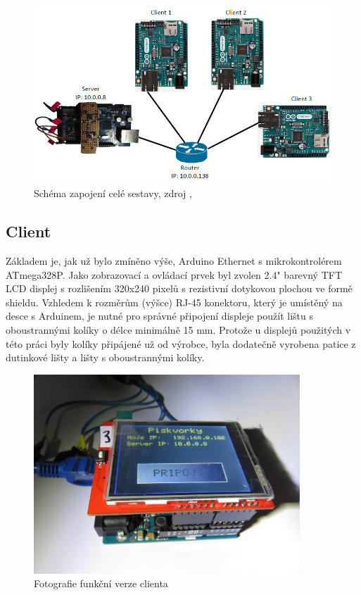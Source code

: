 \documentclass[a4paper,12pt, twoside]{article} %
\begin{document}
\begin{figure}[hbtp]
\centering
\includegraphics[width=12cm]{img/schema/schema.png}
\caption{Schéma zapojení celé sestavy, zdroj \cite{router_symbol}, \cite{arduinoEthernet_page}}
\end{figure}
\newpage
\subsection{Client}
\label{sec:client}
Základem je, jak už bylo zmíněno výše, Arduino Ethernet s mikrokontrolérem ATmega328P. Jako zobrazovací a ovládací prvek byl zvolen 2.4" barevný TFT LCD displej s rozlišením 320x240 pixelů s rezistivní dotykovou plochou ve formě shieldu.
Vzhledem k rozměrům (výšce) RJ-45 konektoru, který je umístěný na desce s Arduinem, je nutné pro správné připojení displeje použít lištu s oboustrannými kolíky o délce minimálně 15 mm. Protože u displejů použitých v této práci byly kolíky připájené už od výrobce, byla dodatečně vyrobena patice z dutinkové lišty a lišty s oboustrannými kolíky.

\begin{figure}[hbtp]
\centering
\includegraphics[width=10cm]{img/foto/HW_client.jpg}
\caption{\label{fig:HW_client} Fotografie funkční verze clienta}
\end{figure}
\end{document}
